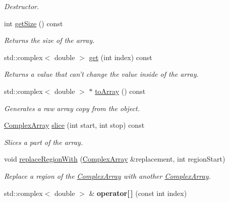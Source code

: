 \begin{DoxyCompactItemize}
\begin{DoxyCompactList}\small\item\em \-Destructor. \end{DoxyCompactList}\item 
\hypertarget{classsimrec_1_1ComplexArray_a4e0da805cc6fe7a5327489dd57bc2666}{int \hyperlink{classsimrec_1_1ComplexArray_a4e0da805cc6fe7a5327489dd57bc2666}{get\-Size} () const }\label{classsimrec_1_1ComplexArray_a4e0da805cc6fe7a5327489dd57bc2666}

\begin{DoxyCompactList}\small\item\em \-Returns the size of the array. \end{DoxyCompactList}\item 
\hypertarget{classsimrec_1_1ComplexArray_af89be28dd5bb1b90e16b5a5f25641b8e}{std\-::complex$<$ double $>$ \hyperlink{classsimrec_1_1ComplexArray_af89be28dd5bb1b90e16b5a5f25641b8e}{get} (int index) const }\label{classsimrec_1_1ComplexArray_af89be28dd5bb1b90e16b5a5f25641b8e}

\begin{DoxyCompactList}\small\item\em \-Returns a value that can't change the value inside of the array. \end{DoxyCompactList}\item 
std\-::complex$<$ double $>$ $\ast$ \hyperlink{classsimrec_1_1ComplexArray_a6cbd3be386f9ac82b88c13807711e747}{to\-Array} () const 
\begin{DoxyCompactList}\small\item\em \-Generates a raw array copy from the object. \end{DoxyCompactList}\item 
\hyperlink{classsimrec_1_1ComplexArray}{\-Complex\-Array} \hyperlink{classsimrec_1_1ComplexArray_a636720d1fbf2dc9d4ccfb2518360d1f1}{slice} (int start, int stop) const 
\begin{DoxyCompactList}\small\item\em \-Slices a part of the array. \end{DoxyCompactList}\item 
void \hyperlink{classsimrec_1_1ComplexArray_a3602250031c1100b2499b32c20e75bbe}{replace\-Region\-With} (\hyperlink{classsimrec_1_1ComplexArray}{\-Complex\-Array} \&replacement, int region\-Start)
\begin{DoxyCompactList}\small\item\em \-Replace a region of the \hyperlink{classsimrec_1_1ComplexArray}{\-Complex\-Array} with another \hyperlink{classsimrec_1_1ComplexArray}{\-Complex\-Array}. \end{DoxyCompactList}\item 
\hypertarget{classsimrec_1_1ComplexArray_a8be48a6c1a7ed53c705be8e55b6cb37a}{std\-::complex$<$ double $>$ \& {\bfseries operator\mbox{[}$\,$\mbox{]}} (const int index)}\label{classsimrec_1_1ComplexArray_a8be48a6c1a7ed53c705be8e55b6cb37a}


\end{DoxyCompactItemize}
